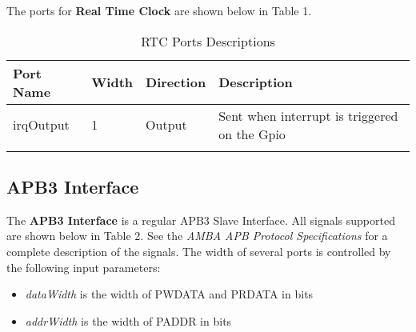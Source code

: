 The ports for \textbf{Real Time Clock} are shown below in 
Table 1.
 
\renewcommand*{\arraystretch}{1.4}
\begin{longtable}[H]{
  | p{}
  | p{}
  | p{}
  | p{} |
  }
  \hline
  \textbf{Port Name} &   
  \textbf{Width} &   
  \textbf{Direction} &   
  \textbf{Description} \\ \hline \hline

  irqOutput &      
  1 & 
  Output &     
  Sent when interrupt is triggered on the Gpio \\ \hline

 
  \caption{RTC Ports Descriptions}\label{table:rtc}
\end{longtable}

\subsection{APB3 Interface}
The \textbf{APB3 Interface} is a regular APB3 Slave Interface. All signals supported are shown below in 
Table 2. See the \textit{AMBA APB Protocol Specifications} for a complete description of the signals. The width of several ports is controlled 
by the following input parameters:

\begin{itemize}[noitemsep]
  \item \textit{dataWidth} is the width of PWDATA and PRDATA in bits
  \item \textit{addrWidth} is the width of PADDR in bits
\end{itemize}
 
